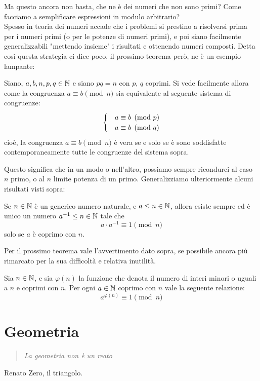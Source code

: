 \documentclass[11pt]{scrartcl}
\begin{document}
	Ma questo ancora non basta, che ne è dei numeri che non sono primi? Come facciamo a semplificare espressioni in modulo arbitrario? \\
	Spesso in teoria dei numeri accade che i problemi si prestino a risolversi prima per i numeri primi (o per le potenze di numeri primi), e poi siano facilmente generalizzabili "mettendo insieme" i risultati e ottenendo numeri composti. Detta così questa strategia ci dice poco, il prossimo teorema però, ne è un esempio lampante:
	\begin{theorem}
		Siano, $a,b,n,p,q\in\mathbb N$ e siano $pq=n$ con $p$, $q$ coprimi. Si vede facilmente allora come la congruenza $a \equiv b \pmod{n}$ sia equivalente al seguente sistema di congruenze:
		\begin{equation}\notag
			\begin{cases}
				&a \equiv b \pmod{p} \\
				&a \equiv b \pmod{q}
			\end{cases}
		\end{equation}
		cioè, la congruenza $a \equiv b \pmod{n}$ è vera se e solo se è sono soddisfatte contemporaneamente tutte le congruenze del sistema sopra.
	\end{theorem}
	Questo significa che in un modo o nell'altro, possiamo sempre ricondurci al caso $n$ primo, o al $n$ limite potenza di un primo.
	Generalizziamo ulteriormente alcuni risultati visti sopra:
	\begin{lemma}
		Se $n\in\mathbb N$ è un generico numero naturale, e $a\le n\in\mathbb N$, allora esiste sempre ed è unico un numero $a^{-1}\le n\in\mathbb N$ tale che 
		$$a\cdot a^{-1} \equiv 1 \pmod{n}$$
		solo se $a$ è coprimo con $n$. 
	\end{lemma}
	Per il prossimo teorema vale l'avvertimento dato sopra, se possibile ancora più rimarcato per la sua difficoltà e relativa inutilità.
	\begin{theorem}
		Sia $n\in\mathbb N$, e sia $\varphi(n)$ la funzione che denota il numero di interi minori o uguali a $n$ e coprimi con $n$. Per ogni $a\in\mathbb N$ coprimo con $n$ vale la seguente relazione:
		$$a^{\varphi(n)}\equiv 1 \pmod{n}$$
	\end{theorem}
	
	\newpage
	\section{Geometria}
	\begin{quote}
		\emph{La geometria non è un reato}
	\end{quote}
	Renato Zero, il triangolo.
\end{document}
